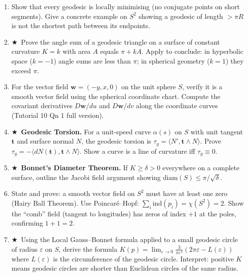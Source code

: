 \documentclass[11pt, a4paper]{article}
\newcommand{\hard}{$\bigstar$\ }
\begin{document}
\begin{enumerate}[label=\textbf{Q\arabic*.}, leftmargin=*, itemsep=6pt]
\item Show that every geodesic is locally minimising (no conjugate points on short segments). Give a concrete example on $S^2$ showing a geodesic of length $>\pi R$ is not the shortest path between its endpoints.

\item \hard Prove the angle sum of a geodesic triangle on a surface of constant curvature $K=k$ with area $A$ equals $\pi+kA$. Apply to conclude: in hyperbolic space ($k=-1$) angle sums are less than $\pi$; in spherical geometry ($k=1$) they exceed $\pi$.

\item For the vector field $\mathbf{w}=(-y,x,0)$ on the unit sphere $S$, verify it is a smooth vector field using the spherical coordinate chart. Compute the covariant derivatives $D\mathbf{w}/du$ and $D\mathbf{w}/dv$ along the coordinate curves (Tutorial 10 Qn 1 full version).

\item \hard \textbf{Geodesic Torsion.} For a unit-speed curve $\alpha(s)$ on $S$ with unit tangent $\mathbf{t}$ and surface normal $N$, the geodesic torsion is $\tau_g=\langle N',\mathbf{t}\wedge N\rangle$. Prove $\tau_g=-\langle dN(\mathbf{t}),\mathbf{t}\wedge N\rangle$. Show a curve is a line of curvature iff $\tau_g\equiv 0$.

\item \hard \textbf{Bonnet's Diameter Theorem.} If $K\geq\delta>0$ everywhere on a complete surface, outline the Jacobi field argument showing $\mathrm{diam}(S)\leq\pi/\sqrt{\delta}$.

\item State and prove: a smooth vector field on $S^2$ must have at least one zero (Hairy Ball Theorem). Use Poincar\'e--Hopf: $\sum_i\mathrm{ind}(p_i)=\chi(S^2)=2$. Show the ``comb'' field (tangent to longitudes) has zeros of index $+1$ at the poles, confirming $1+1=2$.

\item \hard Using the Local Gauss--Bonnet formula applied to a small geodesic circle of radius $\varepsilon$ on $S$, derive the formula $K(p)=\lim_{\varepsilon\to 0}\frac{3}{\pi\varepsilon^4}(2\pi\varepsilon-L(\varepsilon))$ where $L(\varepsilon)$ is the circumference of the geodesic circle. Interpret: positive $K$ means geodesic circles are shorter than Euclidean circles of the same radius.

\end{enumerate}

\newpage
\end{document}
